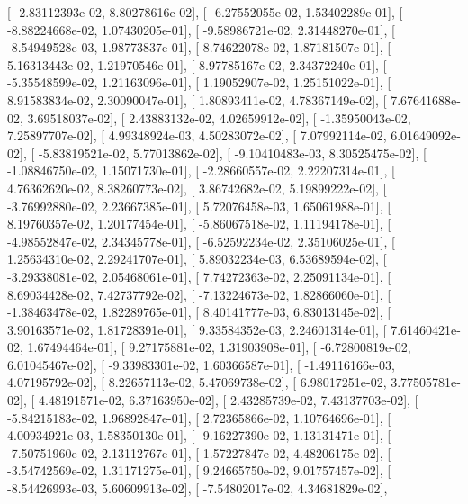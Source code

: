 \documentclass{article}
\begin{document}
       [ -2.83112393e-02,   8.80278616e-02],
       [ -6.27552055e-02,   1.53402289e-01],
       [ -8.88224668e-02,   1.07430205e-01],
       [ -9.58986721e-02,   2.31448270e-01],
       [ -8.54949528e-03,   1.98773837e-01],
       [  8.74622078e-02,   1.87181507e-01],
       [  5.16313443e-02,   1.21970546e-01],
       [  8.97785167e-02,   2.34372240e-01],
       [ -5.35548599e-02,   1.21163096e-01],
       [  1.19052907e-02,   1.25151022e-01],
       [  8.91583834e-02,   2.30090047e-01],
       [  1.80893411e-02,   4.78367149e-02],
       [  7.67641688e-02,   3.69518037e-02],
       [  2.43883132e-02,   4.02659912e-02],
       [ -1.35950043e-02,   7.25897707e-02],
       [  4.99348924e-03,   4.50283072e-02],
       [  7.07992114e-02,   6.01649092e-02],
       [ -5.83819521e-02,   5.77013862e-02],
       [ -9.10410483e-03,   8.30525475e-02],
       [ -1.08846750e-02,   1.15071730e-01],
       [ -2.28660557e-02,   2.22207314e-01],
       [  4.76362620e-02,   8.38260773e-02],
       [  3.86742682e-02,   5.19899222e-02],
       [ -3.76992880e-02,   2.23667385e-01],
       [  5.72076458e-03,   1.65061988e-01],
       [  8.19760357e-02,   1.20177454e-01],
       [ -5.86067518e-02,   1.11194178e-01],
       [ -4.98552847e-02,   2.34345778e-01],
       [ -6.52592234e-02,   2.35106025e-01],
       [  1.25634310e-02,   2.29241707e-01],
       [  5.89032234e-03,   6.53689594e-02],
       [ -3.29338081e-02,   2.05468061e-01],
       [  7.74272363e-02,   2.25091134e-01],
       [  8.69034428e-02,   7.42737792e-02],
       [ -7.13224673e-02,   1.82866060e-01],
       [ -1.38463478e-02,   1.82289765e-01],
       [  8.40141777e-03,   6.83013145e-02],
       [  3.90163571e-02,   1.81728391e-01],
       [  9.33584352e-03,   2.24601314e-01],
       [  7.61460421e-02,   1.67494464e-01],
       [  9.27175881e-02,   1.31903908e-01],
       [ -6.72800819e-02,   6.01045467e-02],
       [ -9.33983301e-02,   1.60366587e-01],
       [ -1.49116166e-03,   4.07195792e-02],
       [  8.22657113e-02,   5.47069738e-02],
       [  6.98017251e-02,   3.77505781e-02],
       [  4.48191571e-02,   6.37163950e-02],
       [  2.43285739e-02,   7.43137703e-02],
       [ -5.84215183e-02,   1.96892847e-01],
       [  2.72365866e-02,   1.10764696e-01],
       [  4.00934921e-03,   1.58350130e-01],
       [ -9.16227390e-02,   1.13131471e-01],
       [ -7.50751960e-02,   2.13112767e-01],
       [  1.57227847e-02,   4.48206175e-02],
       [ -3.54742569e-02,   1.31171275e-01],
       [  9.24665750e-02,   9.01757457e-02],
       [ -8.54426993e-03,   5.60609913e-02],
       [ -7.54802017e-02,   4.34681829e-02],
\end{document}
